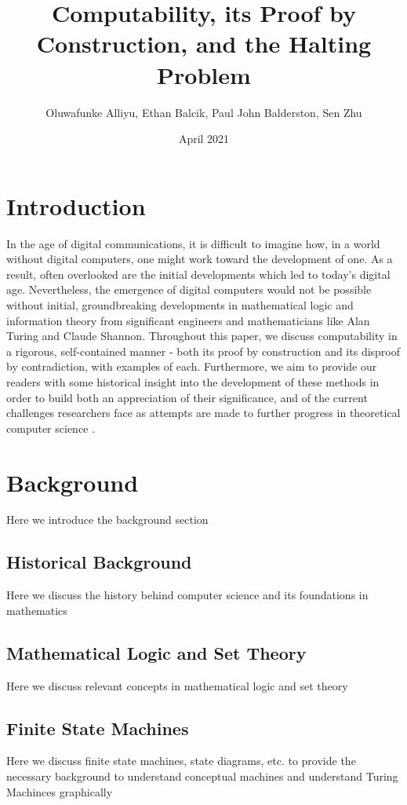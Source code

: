 \documentclass{article}
\title{Computability, its Proof by Construction, and the Halting Problem}
\author{Oluwafunke Alliyu, Ethan Balcik, Paul John Balderston, Sen Zhu}
\date{April 2021}
\begin{document}
\theoremstyle{definition}
\newtheorem{exmp}{Example}[section]
\newtheorem{defin}{Definition}[section]
\newtheorem{prf}{Proof}[section]

\maketitle

\section{Introduction}
In the age of digital communications, it is difficult to imagine how, in a world without digital computers, one might work toward the development of one.  As a result, often overlooked are the initial developments which led to today's digital age.  Nevertheless, the emergence of digital computers would not be possible without initial, groundbreaking developments in mathematical logic and information theory from significant engineers and mathematicians like Alan Turing and Claude Shannon.  Throughout this paper, we discuss computability in a rigorous, self-contained manner - both its proof by construction and its disproof by contradiction, with examples of each.  Furthermore, we aim to provide our readers with some historical insight into the development of these methods in order to build both an appreciation of their significance, and of the current challenges researchers face as attempts are made to further progress in theoretical computer science \cite{1}.

\section{Background}
Here we introduce the background section
\subsection{Historical Background}
Here we discuss the history behind computer science and its foundations in mathematics
\subsection{Mathematical Logic and Set Theory}
Here we discuss relevant concepts in mathematical logic and set theory
\subsection{Finite State Machines}
Here we discuss finite state machines, state diagrams, etc. to provide the necessary background to understand conceptual machines and understand Turing Machinces graphically
\end{document}
